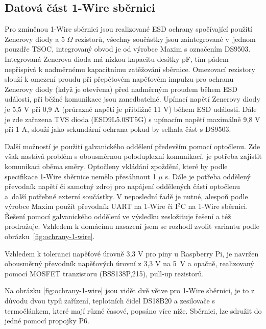 \subsection{Datová část 1-Wire sběrnici}
\label{sec:datova-cast-1-wire-sbernice}
Pro zmíněnou 1-Wire sběrnici jsou realizované ESD ochrany spočívající použití Zenerovy diody a  5 $\Omega$ rezistorů, všechny součástky jsou zaintegrované v~jednom pouzdře TSOC, integrovaný obvod je od výrobce Maxim s označením DS9503. Integrovaná Zenerova dioda má nízkou kapacitu desítky pF, tím pádem nepřispívá k nadměrnému kapacitnímu zatěžování sběrnice. Omezovací rezistory slouží k omezení proudu při přepěťovém napěťovém impulzu pro ochranu Zenerovy diody (když je otevřena) před nadměrným proudem během ESD události, při běžné komunikace jsou zanedbatelné. Upínací napětí Zenerovy diody je 5,5 V při 0,9 A (průrazné napětí je přibližně 11 V) během ESD události. Dále je zde zařazena TVS dioda (ESD9L5.0ST5G) s upínacím napětí maximálně 9,8 V při 1 A, slouží jako sekundární ochrana pokud by selhala část s DS9503. 

Další možností je použití galvanického oddělení především pomocí optočlenu. Zde však nastává problém s obousměrnou poloduplexní komunikací, je potřeba zajistit komunikaci oběma směry. Optočleny vkládání zpoždění, které by podle specifikace 1-Wire sběrnice nemělo přesáhnout 1 $\mu$ s. Dále je potřeba oddělený převodník napětí či samotný zdroj pro napájení oddělených částí optočlenu a~další potřebné externí součástky. V neposlední řadě je nutné, alespoň podle výrobce Maxim použít převodník UART na 1-Wire či I$^2$C na 1-Wire sběrnici. Řešení pomocí galvanického oddělení ve výsledku zesložiťuje řešení a též prodražuje. Vzhledem k domácímu nasazení jsem se rozhodl zvolit variantu podle obrázku~\ref{fig:ochrany-1-wire}.

Vzhledem k toleranci napěťové úrovně 3,3 V pro piny u Raspberry Pi, je navržen obousměrný převodník napěťových úrovní z 3,3 V na 5~V a opačně, realizovaný pomocí MOSFET tranzistoru (BSS138P,215), pull-up rezistorů.

Na obrázku \ref{fig:ochrany-1-wire} jsou vidět dvě větve pro 1-Wire sběrnici, je to z důvodu dvou typů zařízení, teplotních čidel DS18B20 a  zesilovače s termočlánkem, které mají různé časové, popsáno více níže. Sběrnici, lze sdružit do jedné pomocí propojky P6.


